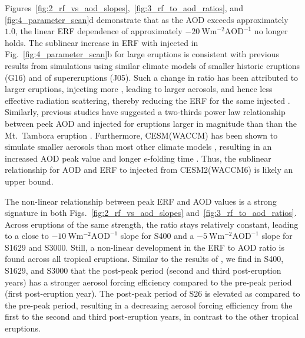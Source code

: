 \documentclass[draft]{agujournal2019}
\begin{document}
  Figures~\ref{fig:2_rf_vs_aod_slopes},~\ref{fig:3_rf_to_aod_ratios}, and
  \ref{fig:4_parameter_scan}d demonstrate that as the AOD exceeds approximately \(1.0\),
  the linear ERF dependence of approximately
  \(\SI{-20}{\watt\metre^{-2}\mathrm{AOD}^{-1}}\) no longer holds. The sublinear
  increase in ERF with injected  in Fig.~\ref{fig:4_parameter_scan}b for large
  eruptions is consistent with previous results from simulations using similar climate
  models of smaller historic eruptions (G16) and of supereruptions (J05). Such a change
  in ratio has been attributed to larger eruptions, injecting more , leading to
  larger aerosols, and hence less effective radiation scattering, thereby reducing the
  ERF for the same injected  \cite{english2013, timmreck2010, timmreck2018}.
  Similarly, previous studies have suggested a two-thirds power law relationship between
  peek AOD and injected  for eruptions larger in magnitude than than the Mt.\
  Tambora eruption \cite{crowley2013,metzner2014,timmreck2024}. Furthermore, CESM(WACCM)
  has been shown to simulate smaller aerosols than most other climate models
  \cite{clyne2021}, resulting in an increased AOD peak value and longer \(e\)-folding
  time \cite{zanchettin2016,clyne2021}. Thus, the sublinear relationship for AOD and ERF
  to injected \ce{SO2} from CESM2(WACCM6) is likely an upper bound.

  The non-linear relationship between peak ERF and AOD values is a strong signature in
  both Figs.~\ref{fig:2_rf_vs_aod_slopes} and~\ref{fig:3_rf_to_aod_ratios}. Across
  eruptions of the same strength, the ratio stays relatively constant, leading to a
  close to \(\SI{-10}{\watt\metre^{-2}\mathrm{AOD}^{-1}}\) slope for S400 and a
  \(\SI{-5}{\watt\metre^{-2}\mathrm{AOD}^{-1}}\) slope for S1629 and S3000. Still, a
  non-linear development in the ERF to AOD ratio is found across all tropical eruptions.
  Similar to the results of \citeA{marshall2020}, we find in S400, S1629, and S3000 that
  the post-peak period (second and third post-eruption years) has a stronger aerosol
  forcing efficiency compared to the pre-peak period (first post-eruption year). The
  post-peak period of S26 is elevated as compared to the pre-peak period, resulting in a
  decreasing aerosol forcing efficiency from the first to the second and third
  post-eruption years, in contrast to the other tropical eruptions.
\end{document}
